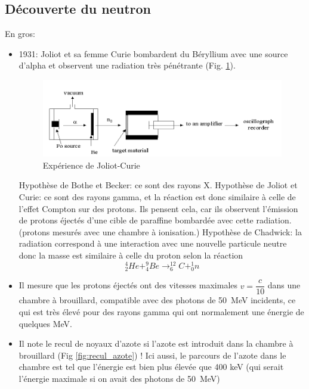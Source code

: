 \subsection{Découverte du neutron}
En gros:
\begin{itemize}
    \item 1931: Joliot et sa femme Curie bombardent du Béryllium avec une source d'alpha et observent une radiation très pénétrante (Fig. \ref{fig:joliot_curie}).

    \begin{figure}[H]
        \centering
        \includegraphics[scale=0.99]{Images1/joliotcurie.PNG}
        \caption{Expérience de Joliot-Curie}
        \label{fig:joliot_curie}
    \end{figure}

    Hypothèse de Bothe et Becker: ce sont des rayons X. Hypothèse de Joliot et Curie: ce sont des rayons gamma, et la réaction est donc similaire à celle de l'effet Compton sur des protons. Ils pensent cela, car ils observent l'émission de protons éjectés d'une cible de paraffine bombardée avec cette radiation. (protons mesurés avec une chambre à ionisation.) Hypothèse de Chadwick: la radiation correspond à une interaction avec une nouvelle particule neutre donc la masse est similaire à celle du proton selon la réaction
    \[
        ^{4}_{2}He + ^{9}_{4}Be \rightarrow ^{12}_{6}C + ^{1}_{0}n
    \]

    \item Il mesure que les protons éjectés ont des vitesses maximales $v=\dfrac{c}{10}$ dans une chambre à brouillard, compatible avec des photons de \SI{50}{MeV} incidents, ce qui est très élevé pour des rayons gamma qui ont normalement une énergie de quelques \si{MeV}.

    \item Il note le recul de noyaux d'azote si l'azote est introduit dans la chambre à brouillard (Fig \ref{fig:recul_azote}) ! Ici aussi, le parcours de l'azote dans le chambre est tel que l'énergie est bien plus élevée que 400 \si{keV} (qui serait l'énergie maximale si on avait des photons de \SI{50}{MeV})



\end{itemize}
